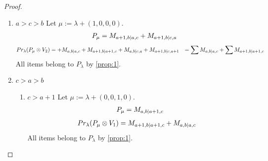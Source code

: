 \documentclass[12pt,a4paper]{article}
\begin{document}
\begin{proof}
\begin{enumerate}
\begin{enumerate}
\item $b=a+1$
        Let $\mu:=\lambda + (1,0,0,0) $. 
\begin{equation}\notag
  \begin{aligned}
      P_{\mu} =
M_{a+1,a+1|a,c}
+M_{a+1,a+1|c,a}
  \end{aligned}
\end{equation}
\begin{equation}\notag
  \begin{aligned}
  Pr_{\lambda}(P_\mu \otimes V_2) &=
M_{a,a+1|a,c}
+M_{a+1,a|a,c}
+M_{a+1,a+1|a+1,c}
+M_{a,a+1|c,a}
+M_{a+1,a|c,a}
+M_{a+1,a+1|c,a+1}\\
                                  &=
\sum M_{a,a+1|a,c}
+\sum M_{a+1,a+1|a+1,c}
  \end{aligned}
\end{equation}
All items belong to $P_\lambda$ by \cref{prop:1}.
  \end{enumerate}
  
\item $a>c>b$
        Let $\mu:=\lambda + (1,0,0,0) $. 
\begin{equation}\notag
  \begin{aligned}
      P_{\mu} =
M_{a+1,b|a,c}
+M_{a+1,b|c,a}
  \end{aligned}
\end{equation}
\begin{equation}\notag
  \begin{aligned}
  Pr_{\lambda}(P_\mu \otimes V_2) &=
+M_{a,b|a,c}
+M_{a+1,b|a+1,c}
+M_{a,b|c,a}
+M_{a+1,b|c,a+1}
                                  &=
\sum M_{a,b|a,c}
+\sum M_{a+1,b|a+1,c}
  \end{aligned}
\end{equation}
All items belong to $P_\lambda$ by \cref{prop:1}.

\item $c>a>b$
  \begin{enumerate}
    \item $c>a+1$
        Let $\mu:=\lambda + (0,0,1,0) $. 
\begin{equation}\notag
  \begin{aligned}
      P_{\mu} =M_{a,b|a+1,c}
  \end{aligned}
\end{equation}
\begin{equation}\notag
  \begin{aligned}
  Pr_{\lambda}(P_\mu \otimes V_1) &=
M_{a+1,b|a+1,c}
+M_{a,b|a,c}
  \end{aligned}
\end{equation}
All items belong to $P_\lambda$ by \cref{prop:1}.
    

\end{enumerate}
\end{enumerate}
\end{proof}
\end{document}
